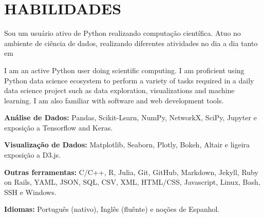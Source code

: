 \documentclass[12pt,a4paper,roman]{moderncv}        %
\begin{document}
\section{HABILIDADES}

\vspace{6pt}
\textsf{Sou um usuário ativo de Python realizando computação científica. Atuo no ambiente de ciência de dados, realizando diferentes atividades no dia a dia tanto em }


I am an active Python user doing scientific computing. I am proficient using Python data science ecosystem to perform a variety of tasks required in a daily data science project such as data exploration, visualizations and machine learning. I am also familiar with software and web development tools. 
\vspace{6pt}

\textbf{Análise de Dados:} Pandas, Scikit-Learn, NumPy, NetworkX, SciPy, Jupyter e exposição a Tensorflow and Keras.

\vspace{6pt}

 \textbf{Visualização de Dados:} Matplotlib, Seaborn, Plotly, Bokeh, Altair e ligeira exposição a D3.js.

\vspace{6pt}

\textbf{Outras ferramentas:} C/C++, R, Julia, Git, GitHub, Markdown, Jekyll, Ruby on Rails, YAML, JSON, SQL, CSV, XML, HTML/CSS,  Javascript, Linux, Bash, SSH e Windows.

\vspace{6pt}

\textbf{Idiomas:} Português (nativo), Inglês (fluênte) e noções de Espanhol.
\end{document}
